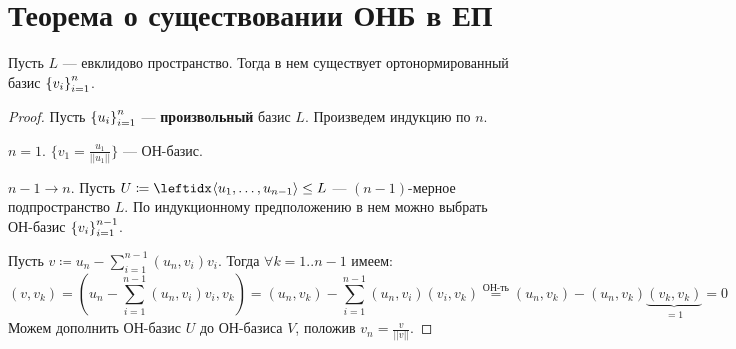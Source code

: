 \section{Теорема о существовании ОНБ в ЕП}

\begin{thm*}
    Пусть $L$ --- евклидово пространство. Тогда в нем существует ортонормированный базис $\left\{v_i\right\}_{i=1}^{n}$.
\end{thm*}

\begin{proof}
    Пусть $\left\{u_i\right\}_{i=1}^{n}$ --- \textbf{произвольный} базис $L$. Произведем индукцию по $n$.
    \smallskip
    
    \underline{$n = 1$}. $\{v_1 = \frac{u_1}{||u_1||}\}$ --- ОН-базис.
    
    \underline{$n-1 \rightarrow n$}. Пусть $U \coloneqq \gen{}{u_1, \ldots, u_{n-1}} \le L$ --- $(n-1)$-мерное подпространство $L$. По индукционному предположению в нем можно выбрать ОН-базис $\left\{v_i\right\}_{i=1}^{n-1}$.
    
    Пусть $v \coloneqq u_n - \sum_{i=1}^{n-1} (u_n, v_i) v_i$. Тогда $\forall k = 1..n-1$ имеем:
    $$(v, v_k) = \left(u_n - \sum_{i=1}^{n-1} (u_n, v_i)v_i, v_k\right) = (u_n, v_k) - \sum_{i=1}^{n-1} (u_n, v_i)(v_i, v_k) \stackrel{\text{ОН-ть}}{=} (u_n, v_k) - (u_n, v_k) \underbrace{(v_k, v_k)}_{=1} = 0$$
    Можем дополнить ОН-базис $U$ до ОН-базиса $V$, положив $v_n = \frac{v}{||v||}$.
\end{proof}